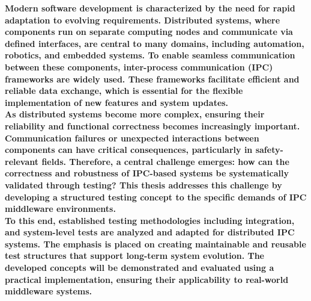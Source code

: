 \documentclass[a4paper,12pt,singlespacing]{article}
\begin{document}
\pagestyle{plain}
\pagebreak
\vspace*{2cm}
\textbf{Modern software development is characterized by the need for rapid adaptation to evolving requirements. Distributed systems, where components run on separate computing nodes and communicate via defined interfaces, are central to many domains, including automation, robotics, and embedded systems. To enable seamless communication between these components, inter-process communication (IPC) frameworks are widely used. These frameworks facilitate efficient and reliable data exchange, which is essential for the flexible implementation of new features and system updates.} \\

\textbf{As distributed systems become more complex, ensuring their reliability and functional correctness becomes increasingly important. Communication failures or unexpected interactions between components can have critical consequences, particularly in safety-relevant fields. Therefore, a central challenge emerges: how can the correctness and robustness of IPC-based systems be systematically validated through testing? This thesis addresses this challenge by developing a structured testing concept to the specific demands of IPC middleware environments.} \\

\textbf{To this end, established testing methodologies including integration, and system-level tests are analyzed and adapted for distributed IPC systems. The emphasis is placed on creating maintainable and reusable test structures that support long-term system evolution. The developed concepts will be demonstrated and evaluated using a practical implementation, ensuring their applicability to real-world middleware systems.}

\pagebreak
\setlength{\cftbeforesecskip}{10pt}
\setlength{\cftbeforesubsecskip}{6pt}
\setlength{\cftbeforesubsubsecskip}{2pt}

\setlength{\cftsecindent}{0pt}
\setlength{\cftsubsecindent}{20pt}
\setlength{\cftsubsubsecindent}{40pt}

\renewcommand{\cftsecfont}{\normalsize\bfseries}
\renewcommand{\cftsubsecfont}{\normalsize}
\renewcommand{\cftsubsubsecfont}{\small}

\renewcommand{\cftsecpagefont}{\bfseries}
\renewcommand{\cftsubsecpagefont}{\normalfont}
\renewcommand{\cftsubsubsecpagefont}{\normalfont}
\tableofcontents
\pagebreak
\end{document}
